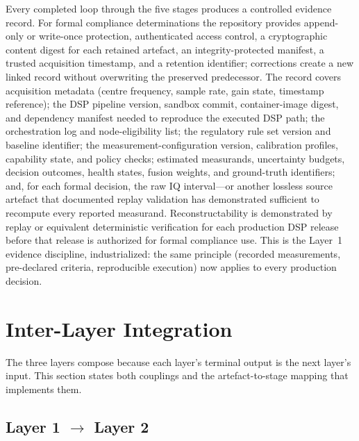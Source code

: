 \documentclass[11pt,a4paper]{article}
\begin{document}
Every completed loop through the five stages produces a controlled evidence record. For formal
compliance determinations the repository provides append-only or write-once protection,
authenticated access control, a cryptographic content digest for each retained artefact, an
integrity-protected manifest, a trusted acquisition timestamp, and a retention identifier;
corrections create a new linked record without overwriting the preserved predecessor. The record
covers acquisition metadata (centre frequency, sample rate, gain state, timestamp reference); the
DSP pipeline version, sandbox commit, container-image digest, and dependency manifest needed to
reproduce the executed DSP path; the orchestration log and node-eligibility list; the regulatory
rule set version and baseline identifier; the measurement-configuration version, calibration
profiles, capability state, and policy checks; estimated measurands, uncertainty budgets, decision
outcomes, health states, fusion weights, and ground-truth identifiers; and, for each formal
decision, the raw I\/Q interval---or another lossless source artefact that documented replay
validation has demonstrated sufficient to recompute every reported measurand. Reconstructability
is demonstrated by replay or equivalent deterministic verification for each production DSP release
before that release is authorized for formal compliance use. This is the Layer~1 evidence
discipline, industrialized: the same principle (recorded measurements, pre-declared criteria,
reproducible execution) now applies to every production decision.

\section{Inter-Layer Integration}
\label{sec:integration}

The three layers compose because each layer's terminal output is the next layer's input. This
section states both couplings and the artefact-to-stage mapping that implements them.

\subsection{Layer 1 $\rightarrow$ Layer 2}
\label{sec:l1-l2}
\end{document}
